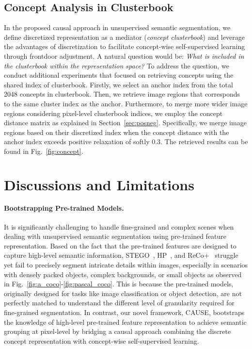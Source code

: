 \documentclass{article} \usepackage{iclr2024_conference,times}
\begin{document}
\subsection{Concept Analysis in Clusterbook}
In the proposed causal approach in unsupervised semantic segmentation, we define discretized representation as a mediator (\textit{concept clusterbook}) and leverage the advantages of discretization to facilitate concept-wise self-supervised learning through frontdoor adjustment. A natural question would be: \textit{What is included in the clusterbook within the representation space?} To address the question, we conduct additional experiments that focused on retrieving concepts using the shared index of clusterbook. Firstly, we select an anchor index from the total 2048 concepts in clusterbook. Then, we retrieve image regions that corresponds to the same cluster index as the anchor. Furthermore, to merge more wider image regions considering pixel-level clusterbook indices, we employ the concept distance matrix as explained in Section~\ref{sec:posneg}. Specifically, we merge image regions based on their discretized index when the concept distance with the anchor index exceeds positive relaxation of softly $0.3$. The retrieved results can be found in Fig.~\ref{fig:concept}.



\section{Discussions and Limitations}
\label{appendix:D}
\paragraph{Bootstrapping Pre-trained Models.} It is significantly challenging to handle fine-grained and complex scenes when dealing with unsupervised semantic segmentation using pre-trained feature representation. Based on the fact that the pre-trained features are designed to capture high-level semantic information, STEGO~\citep{hamilton2022unsupervised}, HP~\citep{seong2023leveraging}, and ReCo+~\citep{shin2022reco} struggle yet fail to precisely segment intricate details within images, especially in scenarios with densely packed objects, complex backgrounds, or small objects as observed in Fig.~\ref{fig:a_coco}-\ref{fig:pascal_coco}. 
This is because the pre-trained models, originally designed for tasks like image classification or object detection, are not perfectly matched to understand the different level of granularity required for fine-grained segmentation. In contrast, our novel framework, CAUSE, bootstraps the knowledge of high-level pre-trained feature representation to achieve semantic grouping at pixel-level by bridging a causal approach combining the discrete concept representation with concept-wise self-supervised learning.
\end{document}
